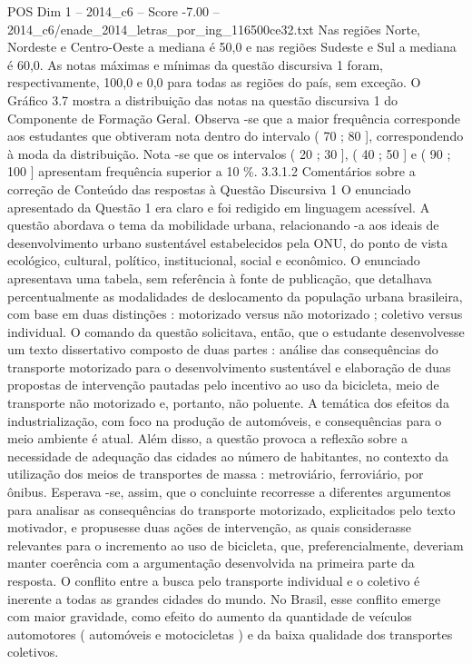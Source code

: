\begin{textsample}{POS Dim 1 – 2014\_c6 – Score -7.00 – 2014\_c6/enade\_2014\_letras\_por\_ing\_116500ce32.txt}
Nas regiões Norte, Nordeste e Centro-Oeste a mediana é 50,0 e nas regiões Sudeste e Sul a mediana é 60,0.
As notas máximas e mínimas da questão discursiva 1 foram, respectivamente, 100,0 e 0,0 para todas as regiões do país, sem exceção.
O Gráfico 3.7 mostra a distribuição das notas na questão discursiva 1 do Componente de Formação Geral.
Observa -se que a maior frequência corresponde aos estudantes que obtiveram nota dentro do intervalo ( 70 ; 80 ], correspondendo à moda da distribuição.
Nota -se que os intervalos ( 20 ; 30 ], ( 40 ; 50 ] e ( 90 ; 100 ] apresentam frequência superior a 10 \%. 3.3.1.2 Comentários sobre a correção de Conteúdo das respostas à Questão Discursiva 1 O enunciado apresentado da Questão 1 era claro e foi redigido em linguagem acessível.
A questão abordava o tema da mobilidade urbana, relacionando -a aos ideais de desenvolvimento urbano sustentável estabelecidos pela ONU, do ponto de vista ecológico, cultural, político, institucional, social e econômico.
O enunciado apresentava uma tabela, sem referência à fonte de publicação, que detalhava percentualmente as modalidades de deslocamento da população urbana brasileira, com base em duas distinções : motorizado versus não motorizado ; coletivo versus individual.
O comando da questão solicitava, então, que o estudante desenvolvesse um texto dissertativo composto de duas partes : análise das consequências do transporte motorizado para o desenvolvimento sustentável e elaboração de duas propostas de intervenção pautadas pelo incentivo ao uso da bicicleta, meio de transporte não motorizado e, portanto, não poluente.
A temática dos efeitos da industrialização, com foco na produção de automóveis, e consequências para o meio ambiente é atual.
Além disso, a questão provoca a reflexão sobre a necessidade de adequação das cidades ao número de habitantes, no contexto da utilização dos meios de transportes de massa : metroviário, ferroviário, por ônibus.
Esperava -se, assim, que o concluinte recorresse a diferentes argumentos para analisar as consequências do transporte motorizado, explicitados pelo texto motivador, e propusesse duas ações de intervenção, as quais considerasse relevantes para o incremento ao uso de bicicleta, que, preferencialmente, deveriam manter coerência com a argumentação desenvolvida na primeira parte da resposta.
O conflito entre a busca pelo transporte individual e o coletivo é inerente a todas as grandes cidades do mundo.
No Brasil, esse conflito emerge com maior gravidade, como efeito do aumento da quantidade de veículos automotores ( automóveis e motocicletas ) e da baixa qualidade dos transportes coletivos.

\end{textsample}
